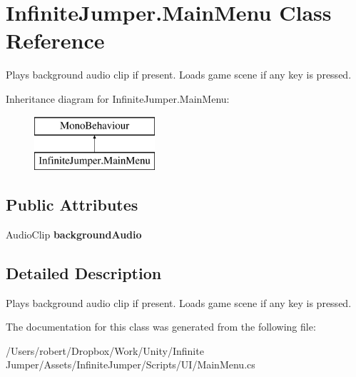 \hypertarget{class_infinite_jumper_1_1_main_menu}{}\section{Infinite\+Jumper.\+Main\+Menu Class Reference}
\label{class_infinite_jumper_1_1_main_menu}


Plays background audio clip if present. Loads game scene if any key is pressed.  


Inheritance diagram for Infinite\+Jumper.\+Main\+Menu\+:\begin{figure}[H]
\begin{center}
\leavevmode
\includegraphics[height=2.000000cm]{class_infinite_jumper_1_1_main_menu}
\end{center}
\end{figure}
\subsection*{Public Attributes}
\begin{DoxyCompactItemize}
\item 
\hypertarget{class_infinite_jumper_1_1_main_menu_aa9f9d8b070e84f18b675d4fdc2ca28bb}{}Audio\+Clip {\bfseries background\+Audio}\label{class_infinite_jumper_1_1_main_menu_aa9f9d8b070e84f18b675d4fdc2ca28bb}

\end{DoxyCompactItemize}


\subsection{Detailed Description}
Plays background audio clip if present. Loads game scene if any key is pressed. 



The documentation for this class was generated from the following file\+:\begin{DoxyCompactItemize}
\item 
/\+Users/robert/\+Dropbox/\+Work/\+Unity/\+Infinite Jumper/\+Assets/\+Infinite\+Jumper/\+Scripts/\+U\+I/Main\+Menu.\+cs\end{DoxyCompactItemize}
